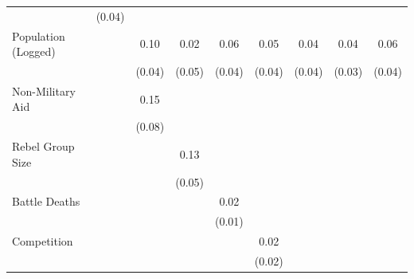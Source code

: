 \documentclass[12pt, letterpaper]{article}
\begin{document}
\begin{table}[htbp]
\begin{small}
\begin{tabular}{l*{8}{c}}
                    &      (0.04)         &                     &                     &                     &                     &                     &                     &                     \\
Population (Logged) &                     &        0.10\sym{**} &        0.02         &        0.06         &        0.05         &        0.04         &        0.04         &        0.06         \\
                    &                     &      (0.04)         &      (0.05)         &      (0.04)         &      (0.04)         &      (0.04)         &      (0.03)         &      (0.04)         \\
Non-Military Aid    &                     &        0.15\sym{*}  &                     &                     &                     &                     &                     &                     \\
                    &                     &      (0.08)         &                     &                     &                     &                     &                     &                     \\
Rebel Group Size    &                     &                     &        0.13\sym{**} &                     &                     &                     &                     &                     \\
                    &                     &                     &      (0.05)         &                     &                     &                     &                     &                     \\
Battle Deaths       &                     &                     &                     &        0.02\sym{**} &                     &                     &                     &                     \\
                    &                     &                     &                     &      (0.01)         &                     &                     &                     &                     \\
Competition         &                     &                     &                     &                     &        0.02         &                     &                     &                     \\
                    &                     &                     &                     &                     &      (0.02)         &                     &                     &                     \\

\end{tabular}
\end{small}
\end{table}
\end{document}
